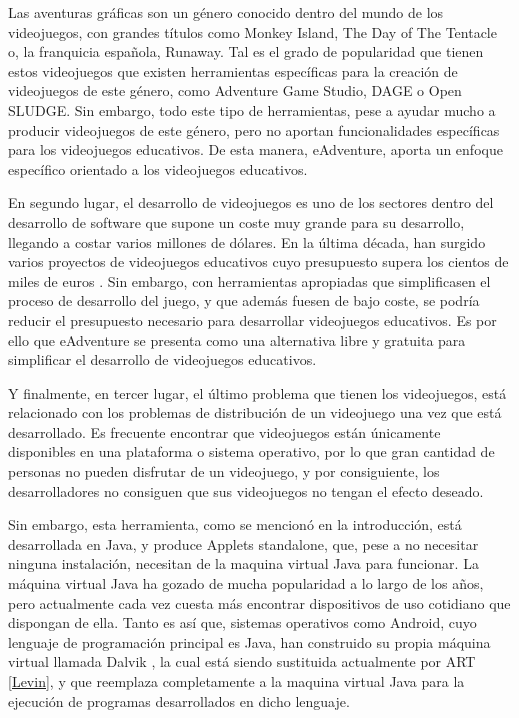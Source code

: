 Las aventuras gráficas son un género conocido dentro del mundo de los videojuegos, con grandes títulos como Monkey Island, The Day of The Tentacle o, la franquicia española, Runaway. Tal es el grado de popularidad que tienen estos videojuegos que existen herramientas específicas para la creación de videojuegos de este género, como Adventure Game Studio, DAGE o Open SLUDGE. Sin embargo, todo este tipo de herramientas, pese a ayudar mucho a producir videojuegos de este género, pero no aportan funcionalidades específicas para los videojuegos educativos. De esta manera, eAdventure, aporta un enfoque específico orientado a los videojuegos educativos. 

En segundo lugar, el desarrollo de videojuegos es uno de los sectores dentro del desarrollo de software que supone un coste muy grande para su desarrollo, llegando a costar varios millones de dólares. En la última década, han surgido varios proyectos de videojuegos educativos cuyo presupuesto supera los cientos de miles de euros \cite{Michael2005}. Sin embargo, con herramientas apropiadas que simplificasen el proceso de desarrollo del juego, y que además fuesen de bajo coste, se podría reducir el presupuesto necesario para desarrollar videojuegos educativos. Es por ello que eAdventure se presenta como una alternativa libre y gratuita para simplificar el desarrollo de videojuegos educativos. 

Y finalmente, en tercer lugar, el último problema que tienen los videojuegos, está relacionado con los problemas de distribución de un videojuego una vez que está desarrollado. Es frecuente encontrar que videojuegos están únicamente
disponibles en una plataforma o sistema operativo, por lo que gran cantidad de personas no pueden disfrutar de un videojuego, y por consiguiente, los desarrolladores no consiguen que sus videojuegos no tengan el efecto deseado.

Sin embargo, esta herramienta, como se mencionó en la introducción, está desarrollada en Java, y produce Applets standalone, que, pese a no necesitar ninguna instalación, necesitan de la maquina virtual Java para funcionar. La máquina virtual Java ha gozado de mucha popularidad a lo largo de los años, pero actualmente cada vez cuesta más encontrar dispositivos de uso cotidiano que dispongan de ella. Tanto es así que, sistemas operativos como Android, cuyo lenguaje de programación principal es Java, han construido su propia máquina virtual llamada Dalvik \cite{Report2009}, la cual está siendo sustituida actualmente por ART \ref{Levin}, y que reemplaza completamente a la maquina virtual Java para la ejecución de programas desarrollados en dicho lenguaje.

